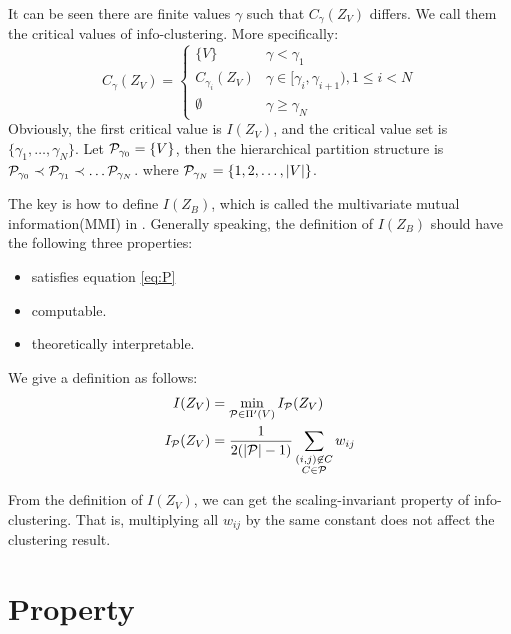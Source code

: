 \documentclass{article}
\begin{document}
It can be seen there are finite values $\gamma$ such that $C_{\gamma}(Z_V)$ differs.
We call them the critical values of info-clustering.
More specifically:
\begin{equation*}
C_{\gamma}(Z_V) = \begin{cases}
\{V\} & \gamma < \gamma_1 \\
C_{\gamma_i}(Z_V) & \gamma \in [\gamma_i, \gamma_{i+1}), 1\leq i < N \\
\emptyset & \gamma \geq \gamma_N
\end{cases}
\end{equation*}
Obviously, the first critical value is $I(Z_V)$, and the critical value set is $\{\gamma_1, \dots, \gamma_N \}$.
Let $\P_{\gamma_0} = \{V\}$, then the hierarchical partition structure is $\P_{\gamma_0} \prec \P_{\gamma_1} \prec \dots \P_{\gamma_N}$.
where $\P_{\gamma_N} = \{1, 2, \dots, \abs{V}\}$.

The key is how to define $I(Z_B)$, which is called the multivariate mutual information(MMI) in \cite{ic}. Generally speaking, the definition of $I(Z_B)$ should have the following three properties:
\begin{itemize}
\item satisfies equation \eqref{eq:P}
\item computable.
\item theoretically interpretable.
\end{itemize}

We give a definition as follows:
\begin{align}\label{eq:IZV}
I(Z_V) & = \min_{\mathcal{P} \in \Pi'(V)} I_{\mathcal{P}}(Z_V) \\
\label{eq:newDef}  I_{\mathcal{P}}(Z_V) & = \frac{1}{ 2( \abs{\mathcal{P}} - 1) } \sum_{\substack{(i,j) \not\in C\\ C\in \mathcal{P}}} w_{ij}
\end{align}

\begin{remark}
From the definition of $I(Z_V)$, we can get the scaling-invariant property of info-clustering. 
That is, multiplying all $ w_{ij}$ by the same constant does not affect the clustering result.
\end{remark}
\section{Property}
\end{document}
